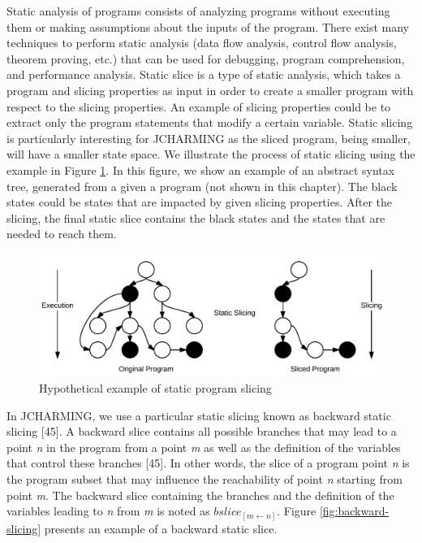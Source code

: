 \documentclass[12pt]{report}
\begin{document}
Static analysis of programs consists of analyzing programs without
executing them or making assumptions about the inputs of the program.
There exist many techniques to perform static analysis (data flow
analysis, control flow analysis, theorem proving, etc.) that can be used
for debugging, program comprehension, and performance analysis. Static
slice is a type of static analysis, which takes a program and slicing
properties as input in order to create a smaller program with respect to
the slicing properties. An example of slicing properties could be to
extract only the program statements that modify a certain variable.
Static slicing is particularly interesting for JCHARMING as the sliced
program, being smaller, will have a smaller state space. We illustrate
the process of static slicing using the example in Figure
\ref{fig:slicing}. In this figure, we show an example of an abstract
syntax tree, generated from a given a program (not shown in this
chapter). The black states could be states that are impacted by given
slicing properties. After the slicing, the final static slice contains
the black states and the states that are needed to reach them.

\begin{figure}
  \centering
    \includegraphics[scale=.2]{media/chap8/slicing.png}
    \caption{Hypothetical example of static program slicing\label{fig:slicing}}
\end{figure}

In JCHARMING, we use a particular static slicing known as backward
static slicing {[}45{]}. A backward slice contains all possible branches
that may lead to a point \emph{n} in the program from a point \emph{m}
as well as the definition of the variables that control these branches
{[}45{]}. In other words, the slice of a program point \emph{n} is the
program subset that may influence the reachability of point \emph{n}
starting from point \emph{m}. The backward slice containing the branches
and the definition of the variables leading to \emph{n} from \emph{m} is
noted as \(bslice_{[m \leftarrow n]}\). Figure
\ref{fig:backward-slicing} presents an example of a backward static
slice.
\end{document}
